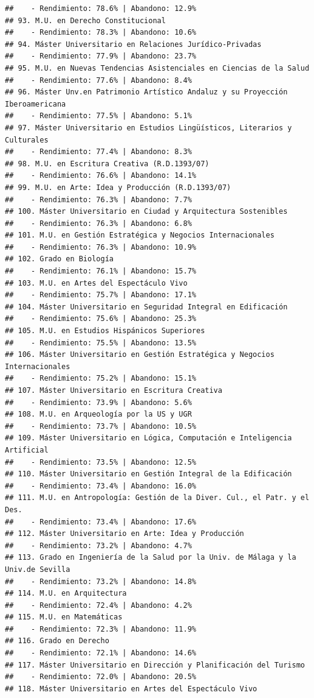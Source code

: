 \documentclass[
]{article}
\begin{document}
\begin{verbatim}
##    - Rendimiento: 78.6% | Abandono: 12.9%
## 93. M.U. en Derecho Constitucional
##    - Rendimiento: 78.3% | Abandono: 10.6%
## 94. Máster Universitario en Relaciones Jurídico-Privadas
##    - Rendimiento: 77.9% | Abandono: 23.7%
## 95. M.U. en Nuevas Tendencias Asistenciales en Ciencias de la Salud
##    - Rendimiento: 77.6% | Abandono: 8.4%
## 96. Máster Unv.en Patrimonio Artístico Andaluz y su Proyección Iberoamericana
##    - Rendimiento: 77.5% | Abandono: 5.1%
## 97. Máster Universitario en Estudios Lingüísticos, Literarios y Culturales
##    - Rendimiento: 77.4% | Abandono: 8.3%
## 98. M.U. en Escritura Creativa (R.D.1393/07)
##    - Rendimiento: 76.6% | Abandono: 14.1%
## 99. M.U. en Arte: Idea y Producción (R.D.1393/07)
##    - Rendimiento: 76.3% | Abandono: 7.7%
## 100. Máster Universitario en Ciudad y Arquitectura Sostenibles
##    - Rendimiento: 76.3% | Abandono: 6.8%
## 101. M.U. en Gestión Estratégica y Negocios Internacionales
##    - Rendimiento: 76.3% | Abandono: 10.9%
## 102. Grado en Biología
##    - Rendimiento: 76.1% | Abandono: 15.7%
## 103. M.U. en Artes del Espectáculo Vivo
##    - Rendimiento: 75.7% | Abandono: 17.1%
## 104. Máster Universitario en Seguridad Integral en Edificación
##    - Rendimiento: 75.6% | Abandono: 25.3%
## 105. M.U. en Estudios Hispánicos Superiores
##    - Rendimiento: 75.5% | Abandono: 13.5%
## 106. Máster Universitario en Gestión Estratégica y Negocios Internacionales
##    - Rendimiento: 75.2% | Abandono: 15.1%
## 107. Máster Universitario en Escritura Creativa
##    - Rendimiento: 73.9% | Abandono: 5.6%
## 108. M.U. en Arqueología por la US y UGR
##    - Rendimiento: 73.7% | Abandono: 10.5%
## 109. Máster Universitario en Lógica, Computación e Inteligencia Artificial
##    - Rendimiento: 73.5% | Abandono: 12.5%
## 110. Máster Universitario en Gestión Integral de la Edificación
##    - Rendimiento: 73.4% | Abandono: 16.0%
## 111. M.U. en Antropología: Gestión de la Diver. Cul., el Patr. y el Des.
##    - Rendimiento: 73.4% | Abandono: 17.6%
## 112. Máster Universitario en Arte: Idea y Producción
##    - Rendimiento: 73.2% | Abandono: 4.7%
## 113. Grado en Ingeniería de la Salud por la Univ. de Málaga y la Univ.de Sevilla
##    - Rendimiento: 73.2% | Abandono: 14.8%
## 114. M.U. en Arquitectura
##    - Rendimiento: 72.4% | Abandono: 4.2%
## 115. M.U. en Matemáticas
##    - Rendimiento: 72.3% | Abandono: 11.9%
## 116. Grado en Derecho
##    - Rendimiento: 72.1% | Abandono: 14.6%
## 117. Máster Universitario en Dirección y Planificación del Turismo
##    - Rendimiento: 72.0% | Abandono: 20.5%
## 118. Máster Universitario en Artes del Espectáculo Vivo

\end{verbatim}
\end{document}
